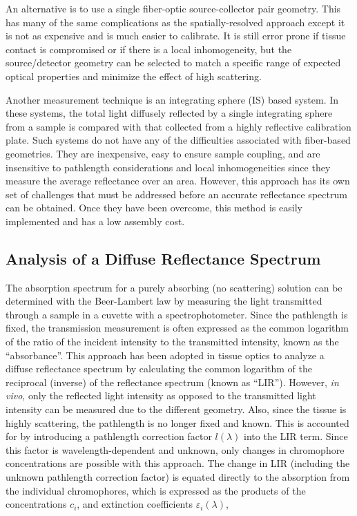 An alternative is to use a single fiber-optic source-collector pair geometry. This has many of the same complications as the spatially-resolved approach except it is not as expensive and is much easier to calibrate. It is still error prone if tissue contact is compromised or if there is a local inhomogeneity, but the source/detector geometry can be selected to match a specific range of expected optical properties and minimize the effect of high scattering.

Another measurement technique is an integrating sphere (IS) based system.\cite{Marchesini1991,Zhang2012} In these systems, the total light diffusely reflected by a single integrating sphere from a sample is compared with that collected from a highly reflective calibration plate. Such systems do not have any of the difficulties associated with fiber-based geometries. They are inexpensive, easy to ensure sample coupling, and are insensitive to pathlength considerations and local inhomogeneities since they measure the average reflectance over an area. However, this approach has its own set of challenges that must be addressed before an accurate reflectance spectrum can be obtained. Once they have been overcome, this method is easily implemented and has a low assembly cost.

\subsection{Analysis of a Diffuse Reflectance Spectrum}
The absorption spectrum for a purely absorbing (no scattering) solution can be determined with the Beer-Lambert law by measuring the light transmitted through a sample in a cuvette with a spectrophotometer.\cite{Niemz2007} Since the pathlength is fixed, the transmission measurement is often expressed as the common logarithm of the ratio of the incident intensity to the transmitted intensity, known as the ``absorbance''. This approach has been adopted in tissue optics to analyze a diffuse reflectance spectrum by calculating the common logarithm of the reciprocal (inverse) of the reflectance spectrum (known as “LIR”).\cite{Dawson1980,Feather1989} However, \emph{in vivo}, only the reflected light intensity as opposed to the transmitted light intensity can be measured due to the different geometry. Also, since the tissue is highly scattering, the pathlength is no longer fixed and known. This is accounted for by introducing a pathlength correction factor $l(\lambda)$ into the LIR term. Since this factor is wavelength-dependent and unknown, only changes in chromophore concentrations are possible with this approach. The change in LIR (including the unknown pathlength correction factor) is equated directly to the absorption from the individual chromophores, which is expressed as the products of the concentrations $c_i$, and extinction coefficients $\varepsilon_i(\lambda)$,\cite{Kollias2010}

